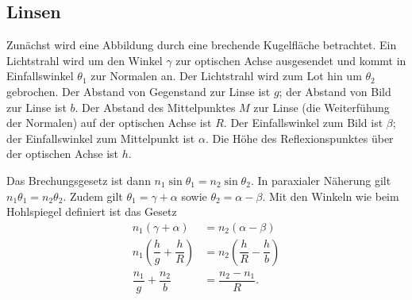 \documentclass[a4paper,12pt]{article}
\numberwithin{equation}{section}
\begin{document}
\subsection{Linsen}
Zunächst wird eine Abbildung durch eine brechende Kugelfläche betrachtet. Ein Lichtstrahl wird um den Winkel $\gamma $ zur optischen Achse ausgesendet und kommt in Einfallswinkel $\theta _1$ zur Normalen an. Der Lichtstrahl wird zum Lot hin um $\theta _2$ gebrochen. Der Abstand von Gegenstand zur Linse ist $g$; der Abstand von Bild zur Linse ist $b$. Der Abstand des Mittelpunktes $M$ zur Linse (die Weiterfühung der Normalen) auf der optischen Achse ist $R$. Der Einfallswinkel zum Bild ist $\beta $; der Einfallswinkel zum Mittelpunkt ist $\alpha $. Die Höhe des Reflexionspunktes über der optischen Achse ist $h$.\par
Das Brechungsgesetz ist dann $n_1\sin \theta _1=n_2\sin \theta _2$. In paraxialer Näherung gilt $n_1\theta _1=n_2\theta _2$. Zudem gilt $\theta _1=\gamma +\alpha $ sowie $\theta _2=\alpha -\beta $. Mit den Winkeln wie beim Hohlspiegel definiert ist das Gesetz
\begin{align} 
        n_1\left(\gamma +\alpha \right)&=n_2\left(\alpha -\beta \right)\\
        n_1\left(\dfrac{h}{g}+\dfrac{h}{R}\right)&=n_2\left(\dfrac{h}{R}-\dfrac{h}{b}\right)\\
        \dfrac{n_1}{g}+\dfrac{n_2}{b}&=\dfrac{n_2-n_1}{R}
.\end{align} 


\end{document}
